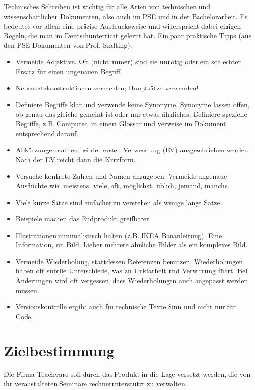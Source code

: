 \documentclass[parskip=full]{scrartcl}
\begin{document}
Technisches Schreiben ist wichtig für alle Arten von technischen und wissenschaftlichen Dokumenten, also auch im PSE und in der Bachelorarbeit.
Es bedeutet vor allem eine präzise Ausdrucksweise und widerspricht dabei einigen Regeln, die man im Deutschunterricht gelernt hat.
Ein paar praktische Tipps (aus den PSE-Dokumenten von Prof. Snelting):
\begin{itemize}[nosep]
\item Vermeide Adjektive.
      Oft (nicht immer) sind sie unnötig oder ein schlechter Ersatz für einen ungenauen Begriff.
\item Nebensatzkonstruktionen vermeiden; Hauptsätze verwenden!
\item Definiere Begriffe klar und verwende keine Synonyme.
      Synonyme lassen offen, ob genau das gleiche gemeint ist oder nur etwas ähnliches.
      Definiere spezielle Begriffe, z.B. \gls{Computer}, in einem Glossar und verweise im Dokument entsprechend darauf.
\item Abkürzungen sollten bei der ersten Verwendung (EV) ausgeschrieben werden.
      Nach der EV reicht dann die Kurzform.
\item Versuche konkrete Zahlen und Namen anzugeben.
      Vermeide ungenaue Ausflüchte wie: meistens, viele, oft, möglichst, üblich, jemand, manche.
\item Viele kurze Sätze sind einfacher zu verstehen als wenige lange Sätze.
\item Beispiele machen das Endprodukt greifbarer.
\item Illustrationen minimalistisch halten (z.B. IKEA Bauanleitung).
      Eine Information, ein Bild.
      Lieber mehrere ähnliche Bilder als ein komplexes Bild.
\item Vermeide Wiederholung, stattdessen Referenzen benutzen.
      Wiederholungen haben oft subtile Unterschiede, was zu Unklarheit und Verwirrung führt.
      Bei Änderungen wird oft vergessen, dass Wiederholungen auch angepasst werden müssen.
\item Versionskontrolle ergibt auch für technische Texte Sinn und nicht nur für Code.
\end{itemize}

%
%
\section{Zielbestimmung}
Die Firma Teachware soll durch das Produkt in die Lage versetzt werden, die von ihr veranstalteten Seminare rechnerunterstützt zu verwalten.
\end{document}
